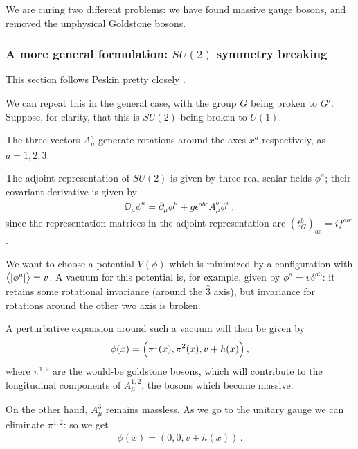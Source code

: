 \documentclass[main.tex]{subfiles}
\begin{document}

We are curing two different problems: we have found massive gauge bosons, and removed the unphysical Goldstone bosons.

\subsubsection{A more general formulation: \(SU(2)\) symmetry breaking}

This section follows Peskin pretty closely \cite[sec.\ 16.2]{peskinConceptsElementaryParticle2019}.

We can repeat this in the general case, with the group \(G\) being broken to \(G'\). Suppose, for clarity, that this is \(SU(2)\) being broken to \(U(1)\).

The three vectors \(A^{a}_{\mu }\) generate rotations around the axes \(x^{a}\) respectively, as \(a = 1, 2, 3\). 

The adjoint representation of \(SU(2)\) is given by three real scalar fields \(\phi^{a}\); their covariant derivative is given by 
%
\begin{align}
\DD_{\mu } \phi^{a} 
= \partial_{\mu } \phi^{a}
+ g \epsilon^{abc} A^{b}_{\mu } \phi^{c}
\,,
\end{align}
%
since the representation matrices in the adjoint representation are \((t^{b}_{G})_{ac} = i f^{abc}\). 

We want to choose a potential \(V(\phi )\) which is minimized by a configuration with \(\expval{\abs{\phi^{a}}} = v\). 
A vacuum for this potential is, for example, given by \(\phi^{a }= v \delta^{a3}\): it retains some rotational invariance (around the \(\hat{3}\) axis), but invariance for rotations around the other two axis is broken. 

A perturbative expansion around such a vacuum will then be given by 
%
\begin{align}
\phi (x) = \qty(\pi^{1} (x), \pi^{2}(x), v + h(x))
\,,
\end{align}
%
where \(\pi^{1, 2}\) are the would-be goldstone bosons, which will contribute to the longitudinal components of \(A^{1,2}_{\mu }\), the bosons which become massive. 

On the other hand, \(A^{3}_{\mu } \) remains massless. 
As we go to the unitary gauge we can eliminate \(\pi^{1, 2}\): so we get 
%
\begin{align}
\phi (x) = (0, 0, v + h(x))
\,.
\end{align}
\end{document}
